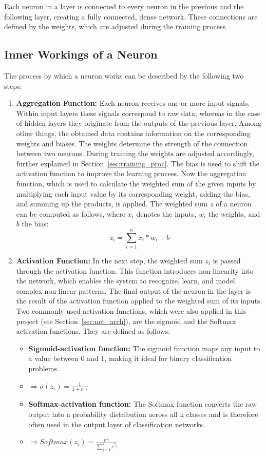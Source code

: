 \documentclass[12pt,fleqn,a4paper]{article}
\begin{document}
Each neuron in a layer is connected to every neuron in the previous and the following layer, creating a fully connected, dense network. These connections are defined by the weights, which are adjusted during the training process.


\subsection{Inner Workings of a Neuron}
The process by which a neuron works can be described by the following two steps:
 \begin{enumerate}
 \item \textbf{Aggregation Function:} Each neuron receives one or more input signals. Within input layers these signals correspond to raw data, whereas in the case of hidden layers they originate from the outputs of the previous layer. Among other things, the obtained data contains information on the corresponding weights and biases. The weights determine the strength of the connection between two neurons. During training the weights are adjusted accordingly, further explained in Section~\ref{sec:training_proc}. The bias is used to shift the activation function to improve the learning process. 
Now the aggregation function, which is used to calculate the weighted sum of the given inputs by multiplying each input value by its corresponding weight, adding the bias, and summing up the products, is applied. The weighted sum $z$ of a neuron can be computed as follows, where $x_i$ denotes the inputs, $w_i$ the weights, and $b$ the bias: \\
$$z_i = \sum_{i=1}^n x_i* w_i +b$$

 \item \textbf{Activation Function:} In the next step, the weighted sum $z_i$ is passed through the activation function. This function introduces non-linearity into the network, which enables the system to recognize, learn, and model complex non-linear patterns. The final output of the neuron in the layer is the result of the activation function applied to the weighted sum of its inputs. Two commonly used activation functions, which were also applied in this project (see Section~\ref{sec:net_arch}), are the sigmoid and the Softmax activation functions. They are defined as follows:
\begin{itemize}
\item \textbf{Sigmoid-activation function:} The sigmoid function maps any input to a value between 0 and 1, making it ideal for binary classification problems. 
\item[]\hspace{1.25cm}$\Rightarrow \sigma(z_i)=\frac{1}{1+e^{-z}}$

\item \textbf{Softmax-activation function:} The Softmax function converts the raw output into a probability distribution across all k classes and is therefore often used in the output layer of classification networks.
\item[]\hspace{1.25cm}$\Rightarrow Softmax(z_i)=\frac{e^{z_i}}{\sum_{j=1}^{k} e^{z_j}}$
\end{itemize}
\end{enumerate}
\end{document}
